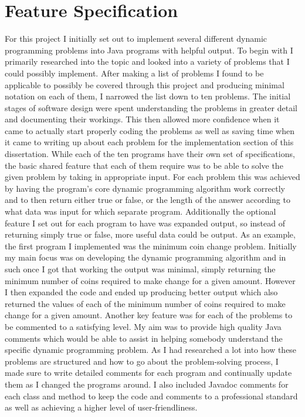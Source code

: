 \section{Feature Specification}
For this project I initially set out to implement several  different dynamic programming problems into Java programs with helpful output. To begin with I primarily researched into the topic and looked into a variety of problems that I could possibly implement. After making a list of problems I found to be applicable to possibly be covered through this project and producing minimal notation on each of them, I narrowed the list down to ten problems. The initial stages of software design were spent understanding the problems in greater detail and documenting their workings. This then allowed more confidence when it came to actually start properly coding the problems as well as saving time when it came to writing up about each problem for the implementation section of this dissertation.
\smallbreak
While each of the ten programs have their own set of specifications, the basic shared feature that each of them require was to be able to solve the given problem by taking in appropriate input. For each problem this was achieved by having the program's core dynamic programming algorithm work correctly and to then return either true or false, or the length of the answer according to what data was input for which separate program. Additionally the optional feature I set out for each program to have was expanded output, so instead of returning simply true or false, more useful data could be output. As an example, the first program I implemented was the minimum coin change problem. Initially my main focus was on developing the dynamic programming algorithm and in such once I got that working the output was minimal, simply returning the minimum number of coins required to make change for a given amount. However I then expanded the code and ended up producing better output which also returned the values of each of the minimum number of coins required to make change for a given amount.
\smallbreak
Another key feature was for each of the problems to be commented to a satisfying level. My aim was to provide high quality Java comments which would be able to assist in helping somebody understand the specific dynamic programming problem. As I had researched a lot into how these problems are structured and how to go about the problem-solving process, I made sure to write detailed comments for each program and continually update them as I changed the programs around. I also included Javadoc comments for each class and method to keep the code and comments to a professional standard as well as achieving a higher level of user-friendliness.

